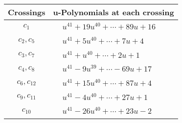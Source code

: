 \documentclass[1p]{elsarticle_modified}
\theoremstyle{definition}
\begin{document}
\begin{tabular}{m{50pt}|m{274pt}}
Crossings & \hspace{64pt}u-Polynomials at each crossing \\
\hline $$\begin{aligned}c_{1}\end{aligned}$$&$\begin{aligned}
&u^{41}+19 u^{40}+\cdots+89 u+16
\end{aligned}$\\
\hline $$\begin{aligned}c_{2},c_{5}\end{aligned}$$&$\begin{aligned}
&u^{41}+5 u^{40}+\cdots+7 u+4
\end{aligned}$\\
\hline $$\begin{aligned}c_{3},c_{7}\end{aligned}$$&$\begin{aligned}
&u^{41}+u^{40}+\cdots+2 u+1
\end{aligned}$\\
\hline $$\begin{aligned}c_{4},c_{8}\end{aligned}$$&$\begin{aligned}
&u^{41}-9 u^{39}+\cdots-69 u+17
\end{aligned}$\\
\hline $$\begin{aligned}c_{6},c_{12}\end{aligned}$$&$\begin{aligned}
&u^{41}+15 u^{40}+\cdots+87 u+4
\end{aligned}$\\
\hline $$\begin{aligned}c_{9},c_{11}\end{aligned}$$&$\begin{aligned}
&u^{41}-4 u^{40}+\cdots+27 u+1
\end{aligned}$\\
\hline $$\begin{aligned}c_{10}\end{aligned}$$&$\begin{aligned}
&u^{41}-26 u^{40}+\cdots+23 u-2
\end{aligned}$\\
\hline
\end{tabular}\\~\\
\newpage\renewcommand{\arraystretch}{1}
\end{document}
